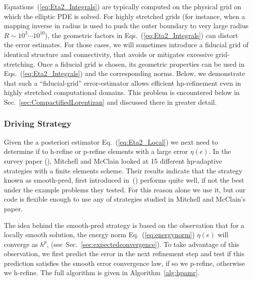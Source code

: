 %
  Equations~(\ref{eq:Eta2_Integrals}) are typically computed on the physical grid on which the elliptic PDE is solved.
  For highly stretched grids (for instance, when a mapping inverse in
  radius is used to push the outer boundary to very large radius
  $R\sim 10^3 \cdots 10^{10}$), the geometric factors in
  Eqs.~(\ref{eq:Eta2_Integrals}) can distort the error estimates.  For
  those cases, we will sometimes introduce a fiducial grid of
  identical structure and connectivity, that avoids or mitigates
  excessive grid-stretching.  Once a fiducial grid is chosen, its geometric properties can be used in Eqs.~(\ref{eq:Eta2_Integrals}) and the corresponding norms.  Below, we demonstrate that such a ``fiducial-grid'' error-estimator allows
  efficient hp-refinement even in highly stretched computational domains.  This problem is encountered below in
Sec.~\ref{sec:CompactifiedLorentizan} and discussed there in greater
detail.

%
\subsubsection{Driving Strategy}

Given the a posteriori estimator
Eq.~(\ref{eq:Eta2_Local}) we next need to determine if  to h-refine or p-refine elements with a large error $\eta(e)$. In the survey paper (\cite{mitchell2011survey}), Mitchell and McClain looked at 15 different hp-adaptive strategies with a finite elements scheme. Their results indicate that the strategy known as smooth-pred, first introduced in~(\cite{melenk2001residual}) performs quite well, if not the best under
the example problems they tested. For this reason alone we use it, but
our code is flexible enough to use any of strategies studied in
Mitchell and McClain's paper.


The idea behind the smooth-pred strategy is based on the observation that for a locally smooth solution, the
energy norm Eq.~(\ref{eq:energynorm}) $\eta(e)$ will converge as
$h^{p}$, (see~Sec.~\ref{sec:expectedconvergence}).  To take advantage of this observation, we first predict the error in the next refinement step and test if this prediction satisfies the smooth error convergence law, if so we p-refine, otherwise we h-refine. The full algorithm is given in Algorithm~\ref{alg:hpamr}.

